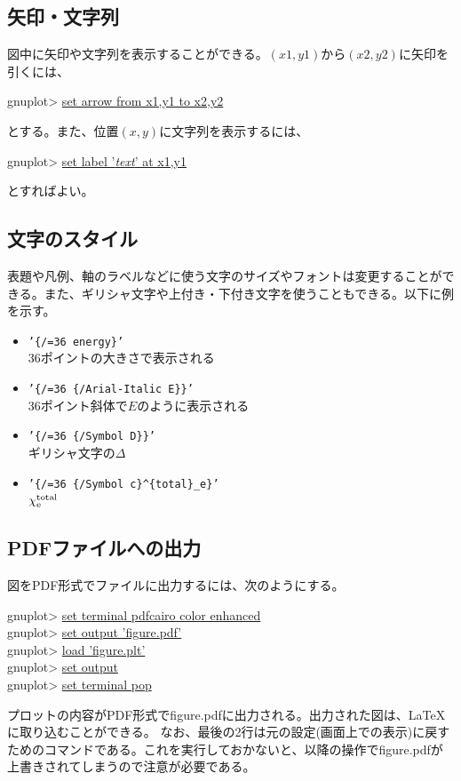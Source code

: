 \subsection{矢印・文字列}

図中に矢印や文字列を表示することができる。\((x1,y1)\)から\((x2,y2)\)に矢印を引くには、
\begin{commandline2}
    gnuplot> \underline{set arrow from x1,y1 to x2,y2}
\end{commandline2} \noindent
とする。また、位置\((x,y)\)に文字列を表示するには、
\begin{commandline2}
    gnuplot> \underline{set label '\textit{text}' at x1,y1}
\end{commandline2} \noindent
とすればよい。

\subsection{文字のスタイル}

表題や凡例、軸のラベルなどに使う文字のサイズやフォントは変更することができる。また、ギリシャ文字や上付き・下付き文字を使うこともできる。以下に例を示す。
\begin{itemize}
    \item \texttt{'\{/=36 energy\}'} \\
          36ポイントの大きさで表示される
    \item \texttt{'\{/=36 \{/Arial-Italic E\}\}'} \\
          36ポイント斜体で\(E\)のように表示される
    \item \texttt{'\{/=36 \{/Symbol D\}\}'} \\
          ギリシャ文字の\(\Delta\)
    \item \texttt{'\{/=36 \{/Symbol c\}\^{}\{total\}\_e\}'} \\
          \(\chi^{\rm total}_{\rm e}\)
\end{itemize}

\subsection{PDFファイルへの出力}

図をPDF形式でファイルに出力するには、次のようにする。
\begin{commandline2}
    gnuplot> \underline{set terminal pdfcairo color enhanced} \\
    gnuplot> \underline{set output 'figure.pdf'} \\
    gnuplot> \underline{load 'figure.plt'} \\
    gnuplot> \underline{set output} \\
    gnuplot> \underline{set terminal pop}
\end{commandline2} \noindent
プロットの内容がPDF形式でfigure.pdfに出力される。出力された図は、\LaTeX に取り込むことができる。
なお、最後の2行は元の設定(画面上での表示)に戻すためのコマンドである。これを実行しておかないと、以降の操作でfigure.pdfが上書きされてしまうので注意が必要である。
